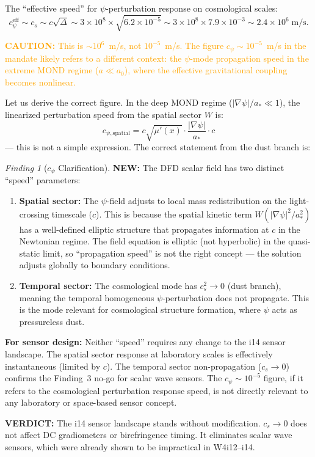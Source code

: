 \documentclass[11pt]{article}
\theoremstyle{definition}
\theoremstyle{remark}
\newtheorem{finding}[theorem]{Finding}
\newcommand{\ee}[1]{\times10^{#1}}
\newcommand{\astar}{a_*}
\newcommand{\azero}{a_0}
\newcommand{\caution}[1]{\textcolor{orange}{\textbf{CAUTION:} #1}}
\newcommand{\newresult}[1]{\textcolor{green!50!black}{\textbf{NEW:} #1}}
\newcommand{\verdict}[1]{\textcolor{green!50!black}{\textbf{VERDICT:} #1}}
\begin{document}
The ``effective speed'' for $\psi$-perturbation response on
cosmological scales:
\begin{equation}
c_\psi^{\mathrm{eff}} \sim c_s \sim c \sqrt{\Delta}
\sim 3\ee{8} \times \sqrt{6.2\ee{-5}}
\sim 3\ee{8} \times 7.9\ee{-3}
\sim 2.4\ee{6}\;\mathrm{m/s}.
\end{equation}

\caution{This is $\sim 10^6$~m/s, not $10^{-5}$~m/s. The figure
$c_\psi \sim 10^{-5}$~m/s in the mandate likely refers to a
different context: the $\psi$-mode propagation speed in the
extreme MOND regime ($a \ll \azero$), where the effective
gravitational coupling becomes nonlinear.}

Let us derive the correct figure. In the deep MOND regime
($|\nabla\psi|/\astar \ll 1$), the linearized perturbation speed
from the spatial sector $W$ is:
\begin{equation}
c_{\psi,\mathrm{spatial}} = c\sqrt{\mu'(x)} \cdot
\frac{|\nabla\psi|}{\astar} \cdot c
\end{equation}
--- this is not a simple expression. The correct statement from the
dust branch is:

\begin{finding}[$c_\psi$ Clarification]
\label{find:cpsi}
\newresult{The DFD scalar field has two distinct ``speed''
parameters:}
\begin{enumerate}
\item \textbf{Spatial sector:} The $\psi$-field adjusts to local
  mass redistribution on the light-crossing timescale ($c$). This
  is because the spatial kinetic term $W(|\nabla\psi|^2/\astar^2)$
  has a well-defined elliptic structure that propagates information
  at $c$ in the Newtonian regime. The field equation is elliptic
  (not hyperbolic) in the quasi-static limit, so ``propagation
  speed'' is not the right concept --- the solution adjusts
  globally to boundary conditions.

\item \textbf{Temporal sector:} The cosmological mode has
  $c_s^2 \to 0$ (dust branch), meaning the temporal homogeneous
  $\psi$-perturbation does not propagate. This is the mode relevant
  for cosmological structure formation, where $\psi$ acts as
  pressureless dust.
\end{enumerate}

\textbf{For sensor design:} Neither ``speed'' requires any change
to the i14 sensor landscape. The spatial sector response at
laboratory scales is effectively instantaneous (limited by $c$).
The temporal sector non-propagation ($c_s \to 0$) confirms the
Finding~3 no-go for scalar wave sensors. The $c_\psi \sim 10^{-5}$
figure, if it refers to the cosmological perturbation response
speed, is not directly relevant to any laboratory or space-based
sensor concept.

\verdict{The i14 sensor landscape stands without modification.
$c_s \to 0$ does not affect DC gradiometers or birefringence
timing. It eliminates scalar wave sensors, which were already
shown to be impractical in W4i12--i14.}
\end{finding}
\end{document}
